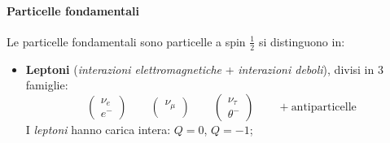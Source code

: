 \paragraph{Particelle fondamentali}
Le particelle fondamentali sono particelle a spin $\frac{1}{2}$ si distinguono
in:
\begin{itemize}
	\item \textbf{Leptoni} (\textit{interazioni elettromagnetiche} +
	      \textit{interazioni deboli}), divisi in $3$ famiglie:
	      \begin{equation}
		      \begin{pmatrix}
			      \nu_e \\ e^-
		      \end{pmatrix}
		      \qquad
		      \begin{pmatrix}
			      \nu_{\mu} \\
		      \end{pmatrix}
		      \qquad
		      \begin{pmatrix}
			      \nu_{\tau} \\ \theta^-
		      \end{pmatrix}
		      \qquad
		      + \text{antiparticelle}
	      \end{equation}
	      I \textit{leptoni} hanno carica intera: $Q = 0$, $Q = -1$;


\end{itemize}
